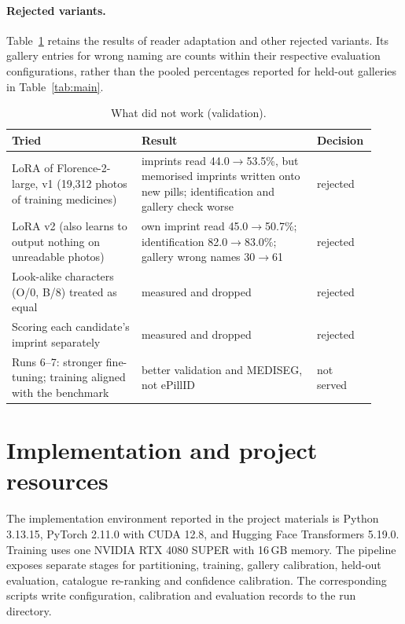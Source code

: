 \paragraph{Rejected variants.} Table~\ref{tab:negative} retains the results of reader adaptation and other rejected variants. Its gallery entries for wrong naming are counts within their respective evaluation configurations, rather than the pooled percentages reported for held-out galleries in Table~\ref{tab:main}.

\begin{table}[!htbp]
  \caption{What did not work (validation).}
  \label{tab:negative}
  \centering
  \small
  \begin{tabular}{@{}p{0.34\linewidth}p{0.46\linewidth}p{0.12\linewidth}@{}}
    \toprule
    Tried & Result & Decision \\
    \midrule
    LoRA of Florence-2-large, v1 (19,312 photos of training medicines) & imprints read 44.0$\to$53.5\%, but
      memorised imprints written onto new pills; identification and gallery check worse & rejected \\
    LoRA v2 (also learns to output nothing on unreadable photos) & own imprint read 45.0$\to$50.7\%; identification
      82.0$\to$83.0\%; gallery wrong names 30$\to$61 & rejected \\
    Look-alike characters (O/0, B/8) treated as equal & measured and dropped & rejected \\
    Scoring each candidate's imprint separately & measured and dropped & rejected \\
    Runs 6--7: stronger fine-tuning; training aligned with the benchmark & better validation and MEDISEG, not ePillID & not
      served \\
    \bottomrule
  \end{tabular}
\end{table}

\FloatBarrier
\section{Implementation and project resources}
\label{app:development}
\label{sec:impl}

The implementation environment reported in the project materials is Python 3.13.15, PyTorch 2.11.0 with CUDA 12.8, and Hugging Face Transformers 5.19.0. Training uses one NVIDIA RTX 4080 SUPER with 16\,GB memory. The pipeline exposes separate stages for partitioning, training, gallery calibration, held-out evaluation, catalogue re-ranking and confidence calibration. The corresponding scripts write configuration, calibration and evaluation records to the run directory.

